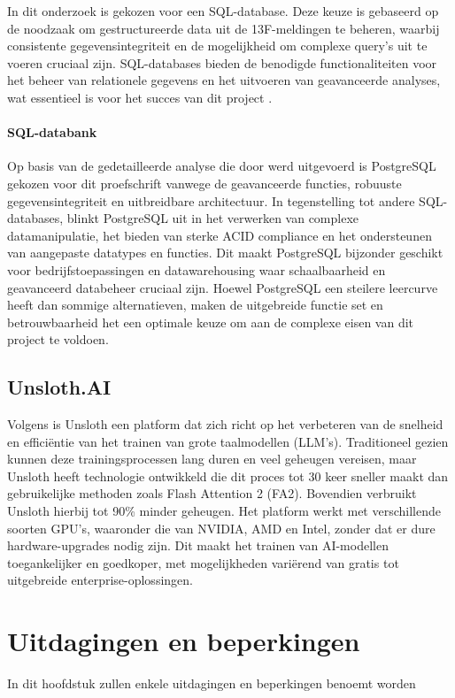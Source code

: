 In dit onderzoek is gekozen voor een SQL-database. Deze keuze is gebaseerd op de noodzaak om gestructureerde data uit de 13F-meldingen te beheren, waarbij consistente gegevensintegriteit en de mogelijkheid om complexe query’s uit te voeren cruciaal zijn. SQL-databases bieden de benodigde functionaliteiten voor het beheer van relationele gegevens en het uitvoeren van geavanceerde analyses, wat essentieel is voor het succes van dit project \autocite{khan2023performance}.

\paragraph{SQL-databank}
Op basis van de gedetailleerde analyse die door \autocite{Javija2024} werd uitgevoerd is PostgreSQL gekozen voor dit proefschrift vanwege de geavanceerde functies, robuuste gegevensintegriteit en uitbreidbare architectuur. In tegenstelling tot andere SQL-databases, blinkt PostgreSQL uit in het verwerken van complexe datamanipulatie, het bieden van sterke ACID compliance en het ondersteunen van aangepaste datatypes en functies. Dit maakt PostgreSQL bijzonder geschikt voor bedrijfstoepassingen en datawarehousing waar schaalbaarheid en geavanceerd databeheer cruciaal zijn. Hoewel PostgreSQL een steilere leercurve heeft dan sommige alternatieven, maken de uitgebreide functie set en betrouwbaarheid het een optimale keuze om aan de complexe eisen van dit project te voldoen.
\subsection{Unsloth.AI}
Volgens \textcite{unsloth2024} is Unsloth een platform dat zich richt op het verbeteren van de snelheid en efficiëntie van het trainen van grote taalmodellen (LLM's). Traditioneel gezien kunnen deze trainingsprocessen lang duren en veel geheugen vereisen, maar Unsloth heeft technologie ontwikkeld die dit proces tot 30 keer sneller maakt dan gebruikelijke methoden zoals Flash Attention 2 (FA2). Bovendien verbruikt Unsloth hierbij tot 90\% minder geheugen. Het platform werkt met verschillende soorten GPU's, waaronder die van NVIDIA, AMD en Intel, zonder dat er dure hardware-upgrades nodig zijn. Dit maakt het trainen van AI-modellen toegankelijker en goedkoper, met mogelijkheden variërend van gratis tot uitgebreide enterprise-oplossingen.



\section{Uitdagingen en beperkingen}
In dit hoofdstuk zullen enkele uitdagingen en beperkingen benoemt worden
